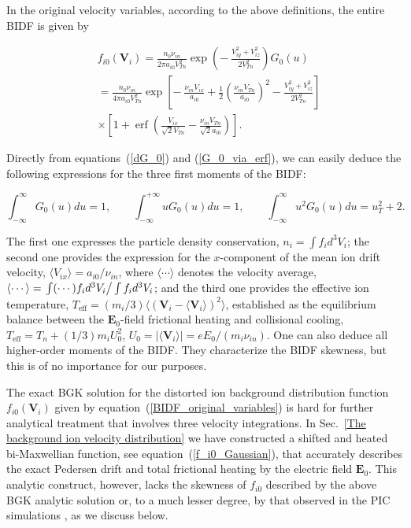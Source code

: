 \documentclass[draft]{agujournal2019}
\renewcommand{\vec}{\mathbf}
\begin{document}
{In the original velocity variables, according to the above definitions, the entire BIDF
is given by
\begin{linenomath*}
\begin{align}
&  f_{i0}(\vec{V}_{i})=\frac{n_{0}\nu_{in}}{2\pi a_{i0}V_{Tn}^{2}}\exp\left(
-\ \frac{V_{iy}^{2}+V_{iz}^{2}}{2V_{Tn}^{2}}\right)  G_{0}\left(  u\right)
\nonumber\\
&  =\frac{n_{0}\nu_{in}}{4\pi a_{i0}V_{Tn}^{2}}\exp\left[  -\ \frac{\nu
_{in}V_{ix}}{a_{i0}}+\frac{1}{2}\left(  \frac{\nu_{in}V_{Tn}}{a_{i0}}\right)
^{2}-\frac{V_{iy}^{2}+V_{iz}^{2}}{2V_{Tn}^{2}}\right] \nonumber\\
&  \times\left[  1+\operatorname{erf}\left(  \frac{V_{ix}}{\sqrt{2}V_{Tn}%
}-\frac{\nu_{in}V_{Tn}}{\sqrt{2}a_{i0}}\right)  \right]  .
\label{BIDF_original_variables}
\end{align}
\end{linenomath*}

Directly from equations~(\ref{dG_0}) and (\ref{G_0_via_erf}), we can easily
deduce the following expressions for the three first moments of the BIDF:
\begin{linenomath*}
\begin{equation}
\int_{-\infty}^{\infty}G_{0}(u)du=1,\qquad\int_{-\infty}^{+\infty}%
uG_{0}(u)du=1,\qquad\int_{-\infty}^{\infty}u^{2}G_{0}(u)du=u_{T}^{2}+2.
\label{three_lowest_moments}
\end{equation}
\end{linenomath*}
The first one expresses the particle density conservation, $n_{i}=\int f_{i}d^{3}V_{i}$; 
the second one provides the expression for the
$x$-component of the mean ion drift velocity, $\langle V_{ix}\rangle =a_{i0}/\nu_{in}$, where $\langle \cdots\rangle$
denotes the velocity average, $\langle \cdots\rangle =\left.
\int(\cdots)f_{i}d^{3}V_{i}\right/\int f_{i}d^{3}V_{i}$; and the third
one provides the effective ion temperature, $T_{\mathrm{eff}}=(m_{i}/3)  
\langle(\vec{V}_{i}-\langle \vec{V}_i\rangle)^{2}\rangle$, established as the equilibrium balance between the $\vec
{E}_{0}$-field frictional heating and collisional cooling, $T_{\mathrm{eff}%
}=T_{n}+(1/3)m_iU_0^{2}$, $U_0=|\langle\vec{V}_i\rangle| = eE_0/(m_i\nu_{in})$. One can also deduce all
higher-order moments of the BIDF. They characterize the BIDF skewness, but
this is of no importance for our purposes.

The exact BGK solution for the distorted ion background distribution function
$f_{i0}(\vec{V}_{i})$ given by equation~(\ref{BIDF_original_variables}) is hard for
further analytical treatment that involves three velocity integrations. In 
Sec.~\ref{The background ion velocity distribution} we have constructed a
shifted and heated bi-Maxwellian function, see equation~(\ref{f_i0_Gaussian}), that accurately describes the exact
Pedersen drift and total frictional heating by the electric field $\vec{E}_{0}$. 
This analytic construct, however, lacks the skewness of $f_{i0}$ described by
the above BGK analytic solution or, to a much lesser degree, by that observed in the PIC simulations
\cite{Koontaweepunya:Non-Maxwellian24}, as we discuss below.

}
\end{document}
